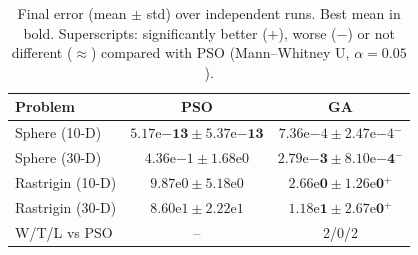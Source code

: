 \begin{table}[t]
\centering
\caption{Final error (mean $\pm$ std) over independent runs. Best mean in bold. Superscripts: significantly better ($+$), worse ($-$) or not different ($\approx$) compared with PSO (Mann--Whitney U, $\alpha=0.05$).}
\label{tab:final-error}
\begin{tabular}{lcc}
\toprule
Problem & PSO & GA \\
\midrule
Sphere (10-D) & $\mathbf{5.17\mathrm{e}{-13} \pm 5.37\mathrm{e}{-13}}$ & $7.36\mathrm{e}{-4} \pm 2.47\mathrm{e}{-4}$$^{-}$ \\
Sphere (30-D) & $4.36\mathrm{e}{-1} \pm 1.68\mathrm{e}{0}$ & $\mathbf{2.79\mathrm{e}{-3} \pm 8.10\mathrm{e}{-4}}$$^{-}$ \\
Rastrigin (10-D) & $9.87\mathrm{e}{0} \pm 5.18\mathrm{e}{0}$ & $\mathbf{2.66\mathrm{e}{0} \pm 1.26\mathrm{e}{0}}$$^{+}$ \\
Rastrigin (30-D) & $8.60\mathrm{e}{1} \pm 2.22\mathrm{e}{1}$ & $\mathbf{1.18\mathrm{e}{1} \pm 2.67\mathrm{e}{0}}$$^{+}$ \\
\midrule
W/T/L vs PSO & -- & 2/0/2 \\
\bottomrule
\end{tabular}
\end{table}
